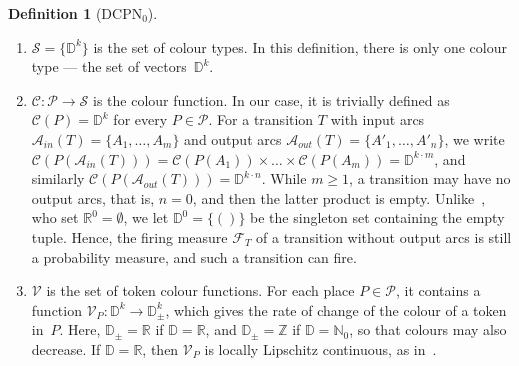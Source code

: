 \documentclass[11pt]{article}
\theoremstyle{definition}
\newcommand{\NatZero}{\mathbb{N}_0}
\newcommand{\Real}{\mathbb{R}}
\newcommand{\Int}{\mathbb{Z}}
\newcommand{\Dom}{\mathbb{D}}
\newcommand{\DCPN}[1]{\texorpdfstring{\textup{DCPN}\ensuremath{_{#1}}}{DCPN#1}}
\newtheorem{definition}{Definition}
\begin{document}
\begin{definition}[\DCPN{0}]
\begin{enumerate}
    \item $\mathcal{S} = \{\Dom^k\}$ is the set of colour types. In this
      definition, there is only one colour type --- the set of
      vectors~$\Dom^k$.

    \item $\mathcal{C} : \mathcal{P} \to \mathcal{S}$ is the colour function.
      In our case, it is trivially defined as $\mathcal{C}(P) = \Dom^k$ for
      every $P \in \mathcal{P}$.  For a transition $T$ with input arcs
      $\mathcal{A}_{\mathit{in}}(T) = \{A_1, \dots, A_m\}$ and output arcs
      $\mathcal{A}_{\mathit{out}}(T) = \{A'_1, \dots, A'_n\}$, we write
      $\mathcal{C}(P(\mathcal{A}_{\mathit{in}}(T))) = \mathcal{C}(P(A_1))
      \times \dots \times \mathcal{C}(P(A_m)) = \Dom^{k \cdot m}$, and
      similarly $\mathcal{C}(P(\mathcal{A}_{\mathit{out}}(T)))
      = \Dom^{k \cdot n}$. While $m \ge 1$, a transition may have no output
      arcs, that is, $n = 0$, and then the latter product is empty.
      Unlike~\cite{EverdijBlom2005}, who set $\Real^0 = \emptyset$, we let
      $\Dom^0 = \{()\}$ be the singleton set containing the empty tuple.
      Hence, the firing measure $\mathcal{F}_T$ of a transition without
      output arcs is still a probability measure, and such a transition can
      fire.

    \item $\mathcal{V}$ is the set of token colour functions. For each
      place $P \in \mathcal{P}$, it contains a function
      $\mathcal{V}_P : \Dom^k \to \Dom_\pm^k$, which gives the rate of
      change of the colour of a token in~$P$. Here, $\Dom_\pm = \Real$ if
      $\Dom = \Real$, and $\Dom_\pm = \Int$ if $\Dom = \NatZero$, so that
      colours may also decrease. If $\Dom = \Real$, then $\mathcal{V}_P$ is
      locally Lipschitz continuous, as in~\cite{EverdijBlom2005}.


\end{enumerate}
\end{definition}
\end{document}
